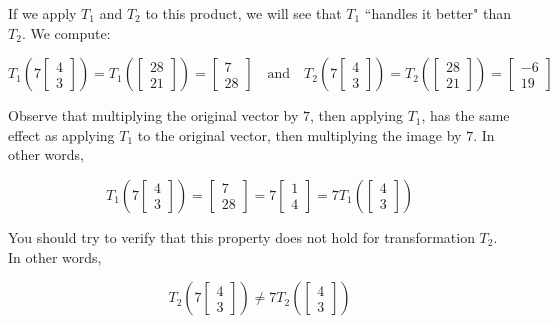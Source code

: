 \documentclass{ximera}
\begin{document}
\begin{initprob}
If we apply $T_1$ and $T_2$ to this product, we will see that $T_1$ ``handles it better" than $T_2$.  We compute:

$$
T_1\left(7\begin{bmatrix}
4\\
3
\end{bmatrix}\right)=T_1\left(\begin{bmatrix}
28\\
21
\end{bmatrix}\right)=\begin{bmatrix}
7\\
28
\end{bmatrix} \quad \text{and} \quad
T_2\left(7\begin{bmatrix}
4\\
3
\end{bmatrix}\right)=T_2\left(\begin{bmatrix}
28\\
21
\end{bmatrix}\right)=\begin{bmatrix}
-6\\
19\end{bmatrix}$$

Observe that multiplying the original vector by $7$, then applying $T_1$, has the same effect as applying $T_1$ to the original vector, then multiplying the image by $7$.  In other words,

$$
T_1\left(7\begin{bmatrix}
4\\
3
\end{bmatrix}\right)=\begin{bmatrix}
7\\
28
\end{bmatrix}=7\begin{bmatrix}
1\\
4
\end{bmatrix}=7T_1\left(\begin{bmatrix}
4\\
3
\end{bmatrix}\right)$$

You should try to verify that this property does not hold for transformation $T_2$.  In other words,

$$
T_2\left(7\begin{bmatrix}
4\\
3
\end{bmatrix}\right)\neq 7T_2\left(\begin{bmatrix}
4\\
3
\end{bmatrix}\right)$$


\end{initprob}
\end{document}
